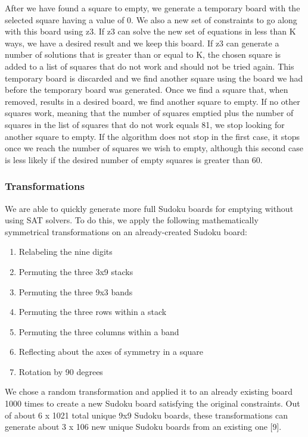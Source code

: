 After we have found a square to empty, we generate a temporary board
with the selected square  having a value of 0. We also a new set of
constraints to go along with this board using z3. If z3 can solve the
new set of equations in less than K ways, we have a desired result and
we keep this board. If z3 can generate a number of solutions that is
greater than or equal to K, the chosen square is added to a list of
squares that do not work and should not be tried again. This temporary
board is discarded and we find another square using the board we had
before the temporary board was generated. Once we find a square that,
when removed, results in a desired board, we find another square to
empty. If no other squares work, meaning that the number of squares
emptied plus the number of squares in the list of squares that do not
work equals 81, we stop looking for another square to empty. If the
algorithm does not stop in the first case, it stops once we reach the
number of squares we wish to empty, although this second case is less
likely if the desired number of empty squares is greater than 60.

\subsubsection{Transformations}
We are able to quickly generate more full Sudoku boards for emptying
without using SAT solvers. To do this, we apply the following
mathematically symmetrical transformations on an already-created
Sudoku board:

\begin{enumerate}
\item Relabeling the nine digits
\item Permuting the three 3x9 stacks
\item Permuting the three 9x3 bands
\item Permuting the three rows within a stack
\item Permuting the three columns within a band
\item Reflecting about the axes of symmetry in a square
\item Rotation by 90 degrees
\end{enumerate}
 
We chose a random transformation and applied it to an already existing
board 1000 times to create a new Sudoku board satisfying the original
constraints. Out of about 6 x 1021 total unique 9x9 Sudoku boards,
these transformations can generate about 3 x 106 new unique Sudoku
boards from an existing one [9].

